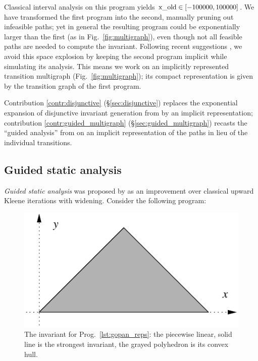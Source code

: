 \documentclass[preprint]{sigplanconf}
\begin{document}
Classical interval analysis on this program yields $\lstinline|x_old| \in [-100000,100000]$.
We have transformed the first program into the second, manually pruning out infeasible paths; yet in general the resulting program could be exponentially larger than the first (as in Fig.~\ref{fig:multigraph}), even though not all feasible paths are needed to compute the invariant.
Following recent suggestions \cite{Gawlitza_Monniaux_ESOP11,Monniaux_Gonnord_SAS11}, we avoid this space explosion by keeping the second program implicit while simulating its analysis. This means we work on an implicitly represented transition multigraph (Fig.~\ref{fig:multigraph}); its compact representation is given by the transition graph of the first program.

Contribution \ref{contr:disjunctive} (\S\ref{sec:disjunctive}) replaces the exponential expansion of disjunctive invariant generation from \citet{DBLP:conf/pldi/GulwaniZ10} by an implicit representation;
contribution \ref{contr:guided_multigraph} (\S\ref{sec:guided_multigraph}) recasts the ``guided analysis'' from \citet{DBLP:conf/sas/GopanR07} on an implicit representation of the paths in lieu of the individual transitions.

\subsection{Guided static analysis}
\label{sec:guided}
\emph{Guided static analysis} was proposed by \citet{DBLP:conf/sas/GopanR07} as an improvement over classical upward Kleene iterations with widening.
Consider the following program:


\begin{figure}
\begin{center}
\includegraphics[scale=0.75]{figures/gopan_reps}
\end{center}
\caption{The invariant for Prog.~\ref{lst:gopan_reps}: the piecewise linear, solid line is the strongest invariant, the grayed polyhedron is its convex hull.}
\label{fig:gopan_reps_invariant} 
\end{figure}
\end{document}

